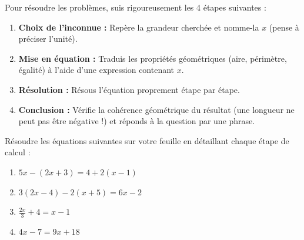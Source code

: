 \documentclass[a4paper]{book}
\begin{document}
\setcounter{chapter}{13} 
\renewcommand{\monTitre}{Approfondissement}

\enteteActivite{2}{\monTitre}{\thechapter}


    \begin{tcolorbox}[colback=yellow!5, colframe=yellow!60!black, title=Méthode : Résoudre un problème géométrique, arc=2mm]
    Pour résoudre les problèmes, suis rigoureusement les 4 étapes suivantes :
    \begin{enumerate}
        \item \textbf{Choix de l'inconnue :} Repère la grandeur cherchée et nomme-la $x$ (pense à préciser l'unité).
        \item \textbf{Mise en équation :} Traduis les propriétés géométriques (aire, périmètre, égalité) à l'aide d'une expression contenant $x$.
        \item \textbf{Résolution :} Résous l'équation proprement étape par étape.
        \item \textbf{Conclusion :} Vérifie la cohérence géométrique du résultat (une longueur ne peut pas être négative !) et réponds à la question par une phrase.
    \end{enumerate}
    \end{tcolorbox}

\vspace{0.2cm}
    
    \begin{exercice}
        Résoudre les équations suivantes sur votre feuille en détaillant chaque étape de calcul :
        \begin{enumerate}
            \item $5x - (2x + 3) = 4 + 2(x - 1)$
            \item $3(2x - 4) - 2(x + 5) = 6x - 2$
            \item $\frac{2x}{3} + 4 = x - 1$
            \item $4x - 7 = 9x + 18$
        \end{enumerate}
    \end{exercice}
    
\end{document}
